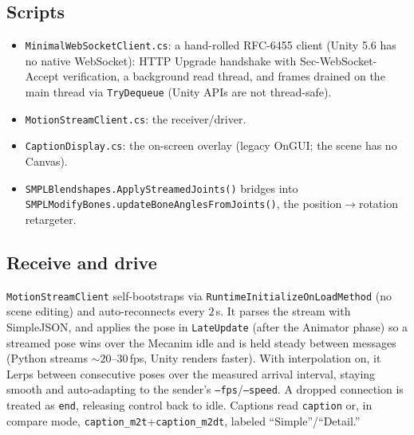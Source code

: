 \documentclass[10pt,twocolumn]{article}
\newcommand{\code}[1]{\texttt{\small #1}}
\begin{document}
\subsection{Scripts}
\begin{itemize}
  \item \code{MinimalWebSocketClient.cs}: a hand-rolled RFC-6455 client (Unity 5.6 has no native
        WebSocket): HTTP Upgrade handshake with Sec-WebSocket-Accept verification, a background
        read thread, and frames drained on the main thread via \code{TryDequeue} (Unity APIs are
        not thread-safe).
  \item \code{MotionStreamClient.cs}: the receiver/driver.
  \item \code{CaptionDisplay.cs}: the on-screen overlay (legacy OnGUI; the scene has no Canvas).
  \item \code{SMPLBlendshapes.ApplyStreamedJoints()} bridges into
        \code{SMPLModifyBones.updateBoneAnglesFromJoints()}, the position$\rightarrow$rotation
        retargeter.
\end{itemize}

\subsection{Receive and drive}
\code{MotionStreamClient} self-bootstraps via \code{RuntimeInitializeOnLoadMethod} (no scene
editing) and auto-reconnects every $2$\,s. It parses the stream with SimpleJSON, and applies the
pose in \code{LateUpdate} (after the Animator phase) so a streamed pose wins over the Mecanim
idle and is held steady between messages (Python streams ${\sim}20$--$30$\,fps, Unity renders
faster). With interpolation on, it Lerps between consecutive poses over the measured arrival
interval, staying smooth and auto-adapting to the sender's \code{--fps}/\code{--speed}. A dropped
connection is treated as \code{end}, releasing control back to idle. Captions read \code{caption}
or, in compare mode, \code{caption\_m2t}+\code{caption\_m2dt}, labeled ``Simple''/``Detail.''
\end{document}
